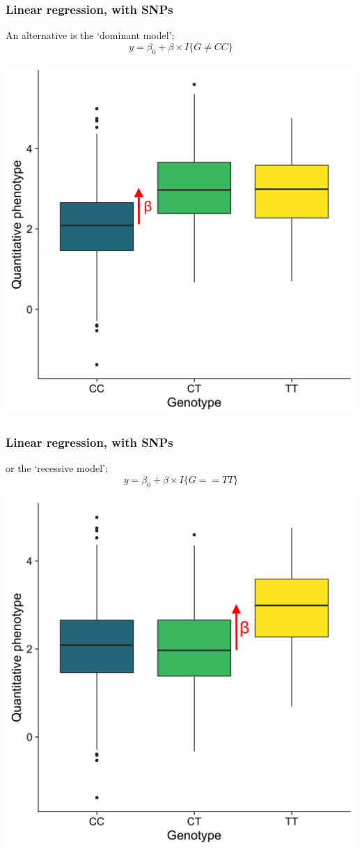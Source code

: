 \documentclass{beamer}
\begin{document}
\begin{frame}
	\frametitle{\bf Linear regression, with SNPs}
	
	An alternative is the `dominant model';
	\[
	y = \beta_0 + \beta\times I\{G\neq CC\}
	\]
	
	\centerline{
		\includegraphics[scale=.08]{Figures/lm_dom.png}
	}
	
\end{frame}


\begin{frame}
	\frametitle{\bf Linear regression, with SNPs}
	or the `recessive model';
	\[
	y = \beta_0 + \beta\times I\{G== TT\}
	\]
	
	\centerline{
\includegraphics[scale=.08]{Figures/lm_rec.png}
	}
	
\end{frame}
\end{document}

